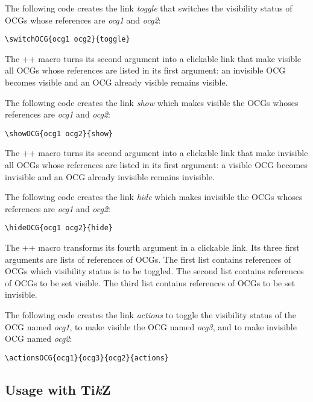 \documentclass[a4paper]{ltxdoc}
\newcommand\TikZ{Ti\emph{k}Z}
\begin{document}
The following code creates the link \emph{toggle} that switches the
visibility status of OCGs whose references are \emph{ocg1} and
\emph{ocg2}:

\begin{lstlisting}[style=TeXcode]
  \switchOCG{ocg1 ocg2}{toggle}
\end{lstlisting}

\DescribeMacro{\showOCG}%
The \code+\showOCG+ macro turns its second argument into a clickable
link that make visible all OCGs whose references are listed in its first
argument: an invisible OCG becomes visible and an OCG already visible
remains visible.

The following code creates the link \emph{show} which makes visible the
OCGs whoses references are \emph{ocg1} and \emph{ocg2}:

\begin{lstlisting}[style=TeXcode]
  \showOCG{ocg1 ocg2}{show}
\end{lstlisting}

\DescribeMacro{\hideOCG}%
The \code+\hideOCG+ macro turns its second argument into a clickable
link that make invisible all OCGs whose references are listed in its
first argument: a visible OCG becomes invisible and an OCG already
invisible remains invisible.

The following code creates the link \emph{hide} which makes invisible
the OCGs whoses references are \emph{ocg1} and \emph{ocg2}:
\begin{lstlisting}[style=TeXcode]
  \hideOCG{ocg1 ocg2}{hide}
\end{lstlisting}

\DescribeMacro{\actionsOCG}%
The \code+\actionsOCG+ macro transforms its fourth argument in a
clickable link. Its three first arguments are lists of references of
OCGs. The first list contains references of OCGs which visibility status
is to be toggled. The second list contains references of OCGs to be set
visible. The third list contains references of OCGs to be set invisible.

The following code creates the link \emph{actions} to toggle the
visibility status of the OCG named \emph{ocg1}, to make visible the OCG
named \emph{ocg3}, and to make invisible OCG named \emph{ocg2}:

\begin{lstlisting}[style=TeXcode]
  \actionsOCG{ocg1}{ocg3}{ocg2}{actions}
\end{lstlisting}

\subsection{Usage with \TikZ{}}
\end{document}
